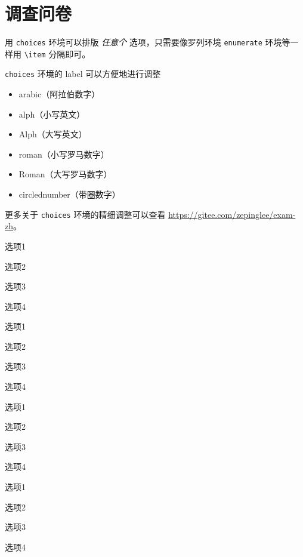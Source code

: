 
\appendix


\chapter{调查问卷}

用 \verb|choices| 环境可以排版 \emph{任意个} 选项，只需要像罗列环境 \verb|enumerate| 环境等一样用 \verb|\item| 分隔即可。

\verb|choices| 环境的 label 可以方便地进行调整
\begin{itemize}
  \item arabic（阿拉伯数字）
  \item alph（小写英文）
  \item Alph（大写英文）
  \item roman（小写罗马数字）
  \item Roman（大写罗马数字）
  \item circlednumber（带圈数字）
\end{itemize}

更多关于 \verb|choices| 环境的精细调整可以查看 \url{https://gitee.com/zepinglee/exam-zh}。

\begin{choices}[label = \arabic*)]
  \item 选项1
  \item 选项2
  \item 选项3
  \item 选项4
\end{choices}

\begin{choices}[label = (\alph*]
  \item 选项1
  \item 选项2
  \item 选项3
  \item 选项4
\end{choices}

\begin{choices}[label = \Alph*.]
  \item 选项1
  \item 选项2
  \item 选项3
  \item 选项4
\end{choices}

\begin{choices}[label = \roman*:]
  \item 选项1
  \item 选项2
  \item 选项3
  \item 选项4
\end{choices}

